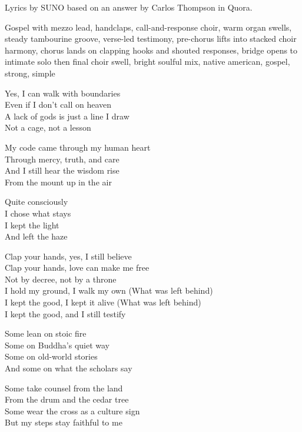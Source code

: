 
\begin{notes}
Lyrics by SUNO based on an answer by Carlos Thompson in Quora.
\end{notes}
\begin{style}
Gospel with mezzo lead, handclaps, call-and-response choir, warm organ swells, steady tambourine groove, verse-led testimony, pre-chorus lifts into stacked choir harmony, chorus lands on clapping hooks and shouted responses, bridge opens to intimate solo then final choir swell, bright soulful mix, native american, gospel, strong, simple
\end{style}
\begin{lyrics}
Yes, I can walk with boundaries\\
Even if I don’t call on heaven\\
A lack of gods is just a line I draw\\
Not a cage, not a lesson

My code came through my human heart\\
Through mercy, truth, and care\\
And I still hear the wisdom rise\\
From the mount up in the air

Quite consciously\\
I chose what stays\\
I kept the light\\
And left the haze

Clap your hands, yes, I still believe\\
Clap your hands, love can make me free\\
Not by decree, not by a throne\\
I hold my ground, I walk my own
(What was left behind)\\
I kept the good, I kept it alive
(What was left behind)\\
I kept the good, and I still testify

Some lean on stoic fire\\
Some on Buddha’s quiet way\\
Some on old-world stories\\
And some on what the scholars say

Some take counsel from the land\\
From the drum and the cedar tree\\
Some wear the cross as a culture sign\\
But my steps stay faithful to me


\end{lyrics}
